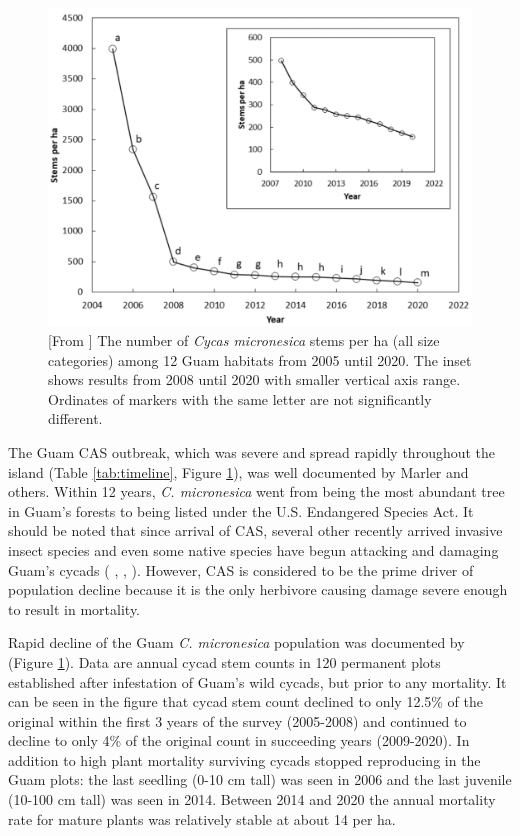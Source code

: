 \documentclass[12pt,letterpaper,english,bibliography=totocnumbered, abstract=on]{scrartcl}
\begin{document}
\begin{figure}[p]
	\centering
	\includegraphics[width=\linewidth]{marler-stem-count}
	
	\caption{[From \cite{marlerLongitudeForestFragmentation2020}] The number
		of \textit{Cycas micronesica} stems per ha (all size categories) among 12 Guam habitats
		from 2005 until 2020. The inset shows results from 2008 until 2020 with smaller vertical axis range. Ordinates of markers with the same letter are not significantly different.}
	
	\label{fig:marler-stem-count}
\end{figure}


The Guam CAS outbreak, which was severe and spread rapidly throughout the island (Table \ref{tab:timeline}, Figure \ref{fig:marler-stem-count}), was well documented by Marler and others. Within 12 years, \textit{C. micronesica} went from being the most abundant tree in Guam's forests to being listed under the U.S. Endangered Species Act. It should be noted that since arrival of CAS, several other recently arrived invasive insect species and even some native species have begun attacking and damaging Guam's cycads (
\cite{marlerPestsCycasMicronesica2006}, \cite{mooreCoalitionInvasiveSpecies2013}, \parencite{delosoBioticThreatsCycas2020a}). 
However, CAS is considered to be the prime driver of population decline because it is the only herbivore causing damage severe enough to result in mortality.

Rapid decline of the Guam \textit{C. micronesica} population was documented by 
\cite{marlerLongitudeForestFragmentation2020} (Figure \ref{fig:marler-stem-count}). Data are annual cycad stem counts in 120 permanent plots established after infestation of Guam's wild cycads, but prior to any mortality. It can be seen in the figure that cycad stem count declined to only 12.5\% of the original within the first 3 years of the survey (2005-2008) and continued to decline to only 4\% of the original count in succeeding years (2009-2020). In addition to high plant mortality surviving cycads stopped reproducing in the Guam plots: the last seedling (0-10 cm tall) was seen in 2006 and the last juvenile (10-100 cm tall) was seen in 2014. Between 2014 and 2020 the annual mortality rate for mature plants was relatively stable at about 14 per ha.
\end{document}
